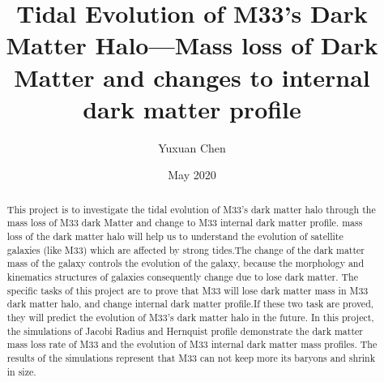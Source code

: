 \documentclass[twocolumn]{aastex63}
\begin{document}
\title{Tidal Evolution of M33's Dark Matter Halo—Mass loss of Dark Matter and changes to internal dark matter profile}

\author{Yuxuan Chen}
\date{May 2020}
\begin{abstract}
 This project is to investigate the tidal evolution of M33's dark matter halo through the mass loss of M33 dark Matter and change to M33 internal dark matter profile. mass loss of the dark matter halo will help us to understand the evolution of satellite galaxies (like M33) which are affected by strong tides.The change of the dark matter mass of the galaxy controls the evolution of the galaxy, because the morphology and kinematics structures of galaxies consequently change due to lose dark matter. The specific tasks of this project are to prove that M33 will lose dark matter mass in M33 dark matter halo, and change internal dark matter profile.If these two task are proved, they will predict the evolution of M33's dark matter halo in the future. In this project, the simulations of Jacobi Radius and Hernquist profile demonstrate the dark matter mass loss rate of M33 and the evolution of M33 internal dark matter mass profiles. The results of the simulations represent that M33 can not keep more its baryons and shrink in size. 
\end{abstract}
\end{document}
